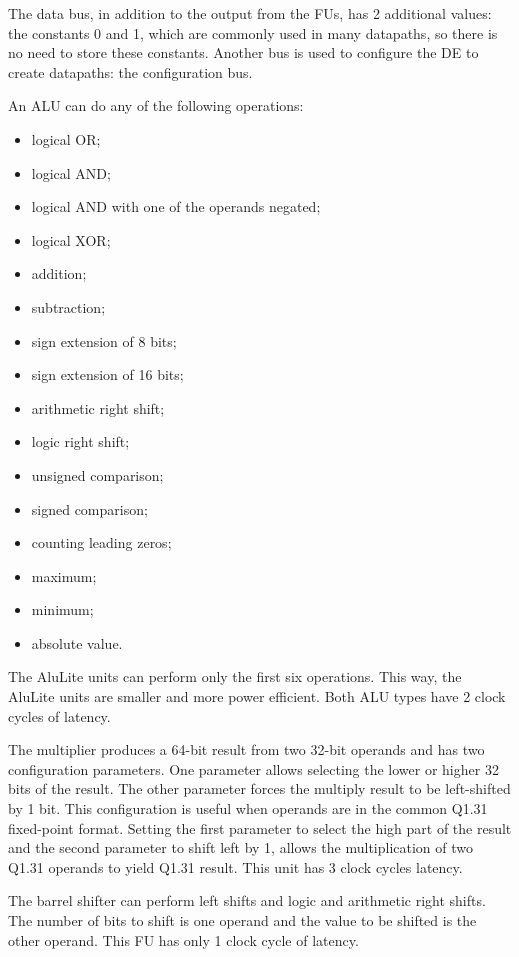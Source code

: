 The data bus, in addition to the output from the FUs, has 2 additional
values: the constants 0 and 1, which are commonly used in many
datapaths, so there is no need to store these constants. Another bus
is used to configure the DE to create datapaths: the configuration
bus.

An ALU can do any of the following operations:
\begin{itemize}
	\item logical OR;
	\item logical AND;
	\item logical AND with one of the operands negated;
	\item logical XOR;
	\item addition;
	\item subtraction;
	\item sign extension of 8 bits;
	\item sign extension of 16 bits;
	\item arithmetic right shift;
	\item logic right shift;
	\item unsigned comparison;
	\item signed comparison;
	\item counting leading zeros;
	\item maximum;
	\item minimum;
	\item absolute value.
\end{itemize}

The AluLite units can perform only the first six operations. This way,
the AluLite units are smaller and more power efficient. Both ALU types
have 2 clock cycles of latency.

The multiplier produces a 64-bit result from two 32-bit operands and
has two configuration parameters. One parameter allows selecting the
lower or higher 32 bits of the result. The other parameter forces the
multiply result to be left-shifted by 1 bit. This configuration is
useful when operands are in the common Q1.31 fixed-point
format. Setting the first parameter to select the high part of the
result and the second parameter to shift left by 1, allows the
multiplication of two Q1.31 operands to yield Q1.31 result.  This unit
has 3 clock cycles latency.

The barrel shifter can perform left shifts and logic and arithmetic
right shifts. The number of bits to shift is one operand and the value
to be shifted is the other operand. This FU has only 1 clock cycle
of latency.

